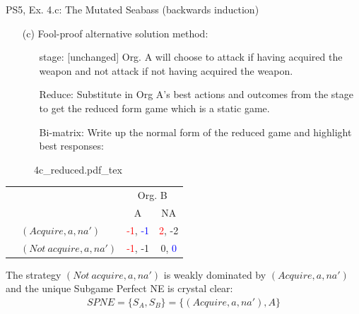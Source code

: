 \begin{frame}{PS5, Ex. 4.c: The Mutated Seabass (backwards induction)}
    \begin{itemize}
      \item[(c)] Fool-proof alternative solution method:
      \begin{itemize}\normalsize
        \item[\nth{3} stage:] [unchanged] Org. A will choose to attack if having acquired the weapon and not attack if not having acquired the weapon.
        \item[Reduce:] Substitute in Org A's best actions and outcomes from the  stage to get the reduced form game which is a static game.
        \item[Bi-matrix:] Write up the normal form of the reduced game and highlight best responses:
      \end{itemize}
    \end{itemize}
    \vspace{-10pt}
    \begin{figure}[!h]
      \center
      \def\svgwidth{.8\columnwidth}
      {4c_reduced.pdf_tex}
    \end{figure}
    \vspace{-10pt}
    \begin{table}
      \begin{tabular}{cl|c|c|}
        & \multicolumn{1}{c}{} & \multicolumn{2}{c}{\color{blue}Org. B}\\
        & \multicolumn{1}{c}{} & \multicolumn{1}{c}{A} & \multicolumn{1}{c}{NA} \\\cline{3-4}
        \parbox[t]{1mm}{}
        & $(Acquire, a, na')$ & \textcolor{red}{-1}, \textcolor{blue}{-1} & \textcolor{red}{2}, -2 \\
        & $(Not\ acquire, a, na')$ & \textcolor{red}{-1}, -1 & 0, \textcolor{blue}{0} \\
      \end{tabular}
    \end{table}
    The strategy $(Not\ acquire, a, na')$ is weakly dominated by $(Acquire, a, na')$ and the unique Subgame Perfect NE is crystal clear:
    \begin{align*}
      SPNE=\{S_A,S_B\}=\{(Acquire, a, na'),A\}
    \end{align*}
  \vfill\null
\end{frame}



